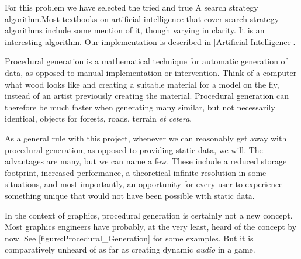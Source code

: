 For this problem we have selected the tried and true A\high{*} search strategy algorithm. Most textbooks on artificial intelligence that cover search strategy algorithms include some mention of it, though varying in clarity. It is an interesting algorithm. Our implementation is described in [Artificial Intelligence].

    {}

Procedural generation is a mathematical technique for automatic generation of data, as opposed to manual implementation or intervention. Think of a computer  what wood looks like and creating a suitable material for a model on the fly, instead of an artist previously creating the material. Procedural generation can therefore be much faster when generating many similar, but not necessarily identical, objects for forests, roads, terrain {\it et cetera}.

    {}
    {}
    {}
    {}
    {}
    {}
    {}
    \stopcombination

As a general rule with this project, whenever we can reasonably get away with procedural generation, as opposed to providing static data, we will. The advantages are many, but we can name a few. These include a reduced storage footprint, increased performance, a theoretical infinite resolution in some situations, and most importantly, an opportunity for every user to experience something unique that would not have been possible with static data.

In the context of graphics, procedural generation is certainly not a new concept. Most graphics engineers have probably, at the very least, heard of the concept by now. See [figure:Procedural_Generation] for some examples. But it is comparatively unheard of as far as creating dynamic {\it audio} in a game. 

